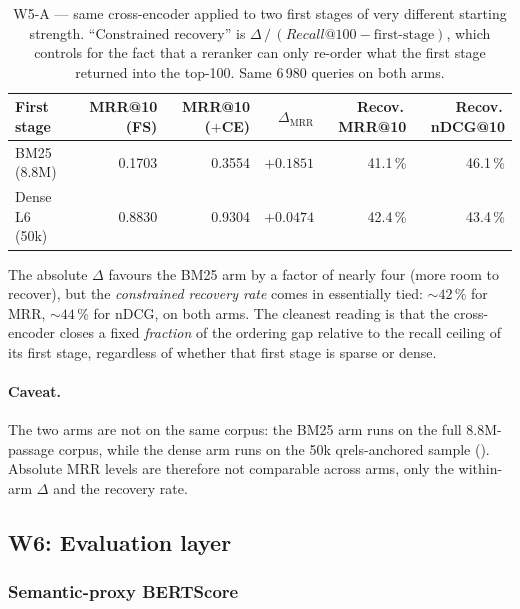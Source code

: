 \documentclass[11pt,a4paper]{article}
\makeatletter
\newcommand{\fdev}{6\,980}
\newcommand{\bertscore}{BERTScore}
\newcommand{\mrr}{MRR@10}
\newcommand{\ndcg}{nDCG@10}
\newcommand{\recallH}{Recall@100}
\newcommand{\bmtwofive}{BM25}
\makeatother
\begin{document}
\begin{table}[H]
  \centering
  \caption{W5-A --- same cross-encoder applied to two first stages
  of very different starting strength.  ``Constrained recovery'' is
  $\Delta\,/\,(\recallH{} - \text{first-stage})$, which controls for
  the fact that a reranker can only re-order what the first stage
  returned into the top-100.  Same \fdev{} queries on both arms.}
  \label{tab:w5a-results}
  \small
  \setlength{\tabcolsep}{4pt}
  \begin{tabular}{@{}lrrrrr@{}}
    \toprule
    First stage           & \mrr{} (FS) & \mrr{} ($+$CE) & $\Delta_\mathrm{MRR}$ & Recov.\,\mrr{} & Recov.\,\ndcg{} \\
    \midrule
    \bmtwofive{} (8.8M)   & 0.1703      & 0.3554         & $+0.1851$             & 41.1\,\%        & 46.1\,\%        \\
    Dense L6 (50k)        & 0.8830      & 0.9304         & $+0.0474$             & 42.4\,\%        & 43.4\,\%        \\
    \bottomrule
  \end{tabular}
\end{table}

The absolute $\Delta$ favours the \bmtwofive{} arm by a factor of
nearly four (more room to recover), but the \emph{constrained
recovery rate} comes in essentially tied: $\sim\!42\,\%$ for MRR,
$\sim\!44\,\%$ for nDCG, on both arms.  The cleanest reading is
that the cross-encoder closes a fixed \emph{fraction} of the
ordering gap relative to the recall ceiling of its first stage,
regardless of whether that first stage is sparse or dense.

\paragraph{Caveat.}  The two arms are not on the same corpus: the
\bmtwofive{} arm runs on the full 8.8M-passage corpus, while the
dense arm runs on the 50k qrels-anchored sample
().  Absolute MRR levels are therefore
not comparable across arms, only the within-arm $\Delta$ and the
recovery rate.

\subsection{W6: Evaluation layer}
\label{sec:w6}

\subsubsection{Semantic-proxy \bertscore{}}
\label{sec:w6-bertscore}
\end{document}
